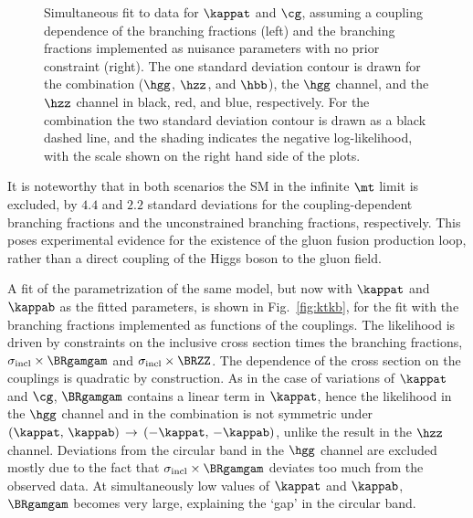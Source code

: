 \begin{figure}[hbtp]
\begin{center}
{        }
    \caption{
        Simultaneous fit to data for $\kappat$ and $\cg$, assuming a coupling dependence of the branching fractions (left) and the branching fractions implemented as nuisance parameters with no prior constraint (right).
        The one standard deviation contour is drawn for the combination ($\hgg$, $\hzz$, and $\hbb$), the $\hgg$ channel, and the $\hzz$ channel in black, red, and blue, respectively.
        For the combination the two standard deviation contour is drawn as a black dashed line, and the shading indicates the negative log-likelihood, with the scale shown on the right hand side of the plots.
        }
    \label{fig:ktcg}
  \end{center}
\end{figure}


It is noteworthy that in both scenarios the SM in the infinite $\mt$ limit is excluded, by $4.4$ and $2.2$ standard deviations for the coupling-dependent branching fractions and the unconstrained branching fractions, respectively.
% 
This poses experimental evidence for the existence of the gluon fusion production loop, rather than a direct coupling of the Higgs boson to the gluon field.




A fit of the parametrization of the same model, but now with $\kappat$ and $\kappab$ as the fitted parameters, is shown in Fig.~\ref{fig:ktkb}, for the fit with the branching fractions implemented as functions of the couplings.
% 
The likelihood is driven by constraints on the inclusive cross section times the branching fractions, $\sigma_\text{incl} \times \BRgamgam$ and $\sigma_\text{incl} \times \BRZZ$.
% 
The dependence of the cross section on the couplings is quadratic by construction.
% 
As in the case of variations of $\kappat$ and $\cg$, $\BRgamgam$ contains a linear term in $\kappat$, hence the likelihood in the $\hgg$ channel and in the combination is not symmetric under $(\kappat,\,\kappab) \, \to \, (-\kappat,\,-\kappab)$, unlike the result in the $\hzz$ channel.
% 
Deviations from the circular band in the $\hgg$ channel are excluded mostly due to the fact that $\sigma_\text{incl} \times \BRgamgam$ deviates too much from the observed data.
% 
At simultaneously low values of $\kappat$ and $\kappab$, $\BRgamgam$ becomes very large, explaining the `gap' in the circular band.



